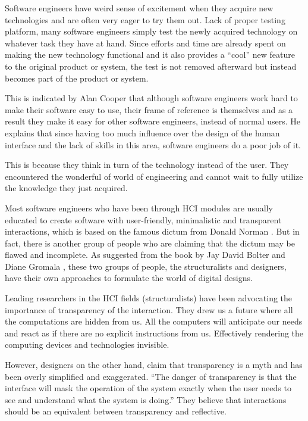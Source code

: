\documentclass{acm_proc_article-sp}
\begin{document}
Software engineers have weird sense of excitement when they acquire
new technologies and are often very eager to try them out. Lack of
proper testing platform, many software engineers simply test the newly
acquired technology on whatever task they have at hand. Since efforts
and time are already spent on making the new technology functional and
it also provides a ``cool'' new feature to the original product or
system, the test is not removed afterward but instead becomes part of
the product or system.

This is indicated by Alan Cooper \cite{inmates:cooper} that although
software engineers work hard to make their software easy to use, their
frame of reference is themselves and as a result they make it easy for
other software engineers, instead of normal users. He explains that
since having too much influence over the design of the human interface
and the lack of skills in this area, software engineers do a poor job
of it.




This is because they think in turn of the technology instead of the
user. They encountered the wonderful of world of engineering and
cannot wait to fully utilize the knowledge they just acquired.




Most software engineers who have been through HCI modules are usually
educated to create software with user-friendly, minimalistic and
transparent interactions, which is based on the famous dictum from
Donald Norman \cite{design:norman}. But in fact, there is another
group of people who are claiming that the dictum may be flawed and
incomplete. As suggested from the book by Jay David Bolter and Diane
Gromala \cite{windows:bolter}, these two groups of people, the
structuralists and designers, have their own approaches to formulate
the world of digital designs.

Leading researchers in the HCI fields (structuralists) have been
advocating the importance of transparency of the interaction. They
drew us a future where all the computations are hidden from us. All
the computers will anticipate our needs and react as if there are no
explicit instructions from us. Effectively rendering the computing
devices and technologies invisible.

However, designers on the other hand, claim that transparency is a
myth and has been overly simplified and exaggerated. ``The danger of
transparency is that the interface will mask the operation of the
system exactly when the user needs to see and understand what the
system is doing.'' They believe that interactions should be an
equivalent between transparency and reflective.
\end{document}
